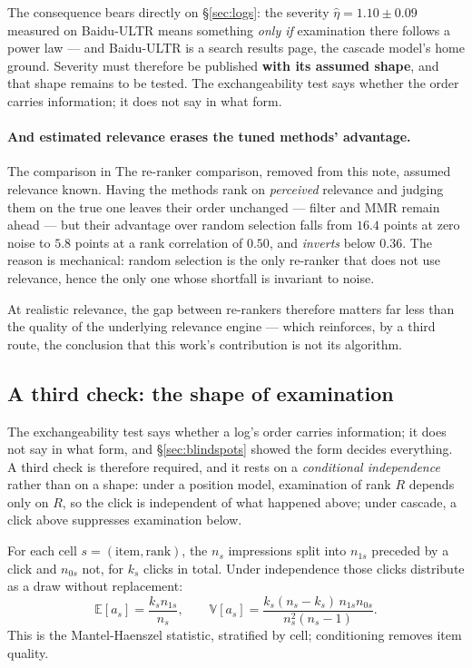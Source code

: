 \documentclass[11pt,a4paper]{article}
\begin{document}
The consequence bears directly on \S\ref{sec:logs}: the severity $\hat\eta = 1.10 \pm 0.09$
measured on Baidu-ULTR means something \emph{only if} examination there follows a power law ---
and Baidu-ULTR is a search results page, the cascade model's home ground. Severity must therefore
be published \textbf{with its assumed shape}, and that shape remains to be tested. The
exchangeability test says whether the order carries information; it does not say in what form.

\paragraph{And estimated relevance erases the tuned methods' advantage.} The comparison in
The re-ranker comparison, removed from this note, assumed relevance known. Having the methods rank on \emph{perceived}
relevance and judging them on the true one leaves their order unchanged --- filter and MMR remain
ahead --- but their advantage over random selection falls from $16.4$ points at zero noise to
$5.8$ points at a rank correlation of $0.50$, and \emph{inverts} below $0.36$. The reason is
mechanical: random selection is the only re-ranker that does not use relevance, hence the only one
whose shortfall is invariant to noise.

At realistic relevance, the gap between re-rankers therefore matters far less than the quality of
the underlying relevance engine --- which reinforces, by a third route, the conclusion that this
work's contribution is not its algorithm.


\subsection{A third check: the shape of examination}
\label{sec:formtest}

The exchangeability test says whether a log's order carries information; it does not say in what
form, and \S\ref{sec:blindspots} showed the form decides everything. A third check is therefore
required, and it rests on a \emph{conditional independence} rather than on a shape: under a
position model, examination of rank $R$ depends only on $R$, so the click is independent of what
happened above; under cascade, a click above suppresses examination below.

For each cell $s = (\text{item}, \text{rank})$, the $n_s$ impressions split into $n_{1s}$ preceded
by a click and $n_{0s}$ not, for $k_s$ clicks in total. Under independence those clicks distribute
as a draw without replacement:
\begin{equation}
\mathbb{E}[a_s] = \frac{k_s n_{1s}}{n_s}, \qquad
\mathbb{V}[a_s] = \frac{k_s (n_s - k_s)\, n_{1s} n_{0s}}{n_s^2 (n_s - 1)} .
\label{eq:form}
\end{equation}
This is the Mantel-Haenszel statistic, stratified by cell; conditioning removes item quality.
\end{document}
